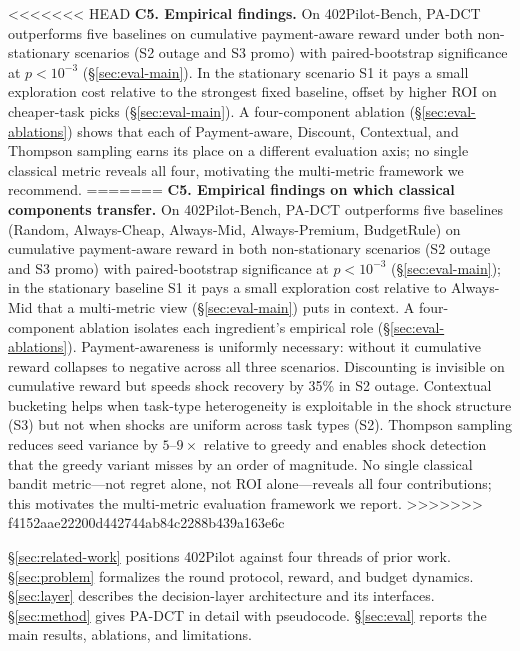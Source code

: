 <<<<<<< HEAD
\textbf{C5. Empirical findings.} On 402Pilot-Bench, PA-DCT outperforms five baselines on cumulative payment-aware reward under both non-stationary scenarios (S2 outage and S3 promo) with paired-bootstrap significance at $p<10^{-3}$ (\S\ref{sec:eval-main}). In the stationary scenario S1 it pays a small exploration cost relative to the strongest fixed baseline, offset by higher ROI on cheaper-task picks (\S\ref{sec:eval-main}). A four-component ablation (\S\ref{sec:eval-ablations}) shows that each of Payment-aware, Discount, Contextual, and Thompson sampling earns its place on a different evaluation axis; no single classical metric reveals all four, motivating the multi-metric framework we recommend.
=======
\textbf{C5. Empirical findings on which classical components transfer.} On 402Pilot-Bench, PA-DCT outperforms five baselines (Random, Always-Cheap, Always-Mid, Always-Premium, BudgetRule) on cumulative payment-aware reward in both non-stationary scenarios (S2 outage and S3 promo) with paired-bootstrap significance at $p<10^{-3}$ (\S\ref{sec:eval-main}); in the stationary baseline S1 it pays a small exploration cost relative to Always-Mid that a multi-metric view (\S\ref{sec:eval-main}) puts in context. A four-component ablation isolates each ingredient's empirical role (\S\ref{sec:eval-ablations}). Payment-awareness is uniformly necessary: without it cumulative reward collapses to negative across all three scenarios. Discounting is invisible on cumulative reward but speeds shock recovery by 35\% in S2 outage. Contextual bucketing helps when task-type heterogeneity is exploitable in the shock structure (S3) but not when shocks are uniform across task types (S2). Thompson sampling reduces seed variance by $5$--$9\times$ relative to greedy and enables shock detection that the greedy variant misses by an order of magnitude. No single classical bandit metric---not regret alone, not ROI alone---reveals all four contributions; this motivates the multi-metric evaluation framework we report.
>>>>>>> f4152aae22200d442744ab84c2288b439a163e6c

\S\ref{sec:related-work} positions 402Pilot against four threads of prior work. \S\ref{sec:problem} formalizes the round protocol, reward, and budget dynamics. \S\ref{sec:layer} describes the decision-layer architecture and its interfaces. \S\ref{sec:method} gives PA-DCT in detail with pseudocode. \S\ref{sec:eval} reports the main results, ablations, and limitations.

